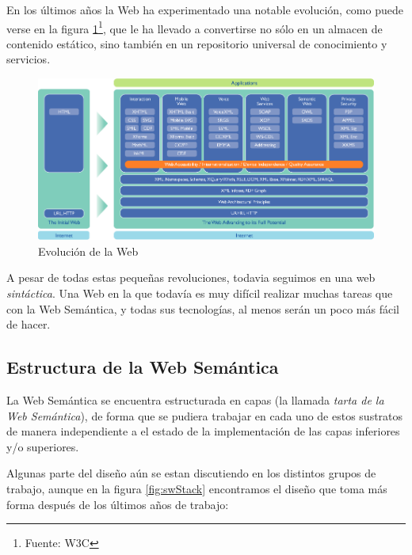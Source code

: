En los últimos años la Web ha experimentado una notable evolución, como puede 
verse en la figura \ref{fig:evoWeb}\footnote{Fuente: W3C}, que le ha llevado a 
convertirse no sólo en un almacen de contenido estático, sino también en un 
repositorio universal de conocimiento y servicios.

\begin{figure}[tp]
	\centering
	\includegraphics[width=12cm]{images/web-evolution.png}
	\caption{Evolución de la Web}
	\label{fig:evoWeb}
\end{figure}

A pesar de todas estas pequeñas revoluciones, todavia seguimos en una web 
\emph{sintáctica}. Una Web en la que todavía es muy difícil realizar
muchas tareas que con la Web Semántica, y todas sus tecnologías, al menos
serán un poco más fácil de hacer.

\subsection{Estructura de la Web Semántica}

La Web Semántica se encuentra estructurada en capas (la llamada \emph{tarta de 
la Web Semántica}), de forma que se pudiera trabajar en cada uno de estos
sustratos de manera independiente a el estado de la implementación de las
capas inferiores y/o superiores.

Algunas parte del diseño aún se estan discutiendo en los distintos grupos de
trabajo, aunque en la figura \ref{fig:swStack} encontramos el diseño que toma
más forma después de los últimos años de trabajo:

